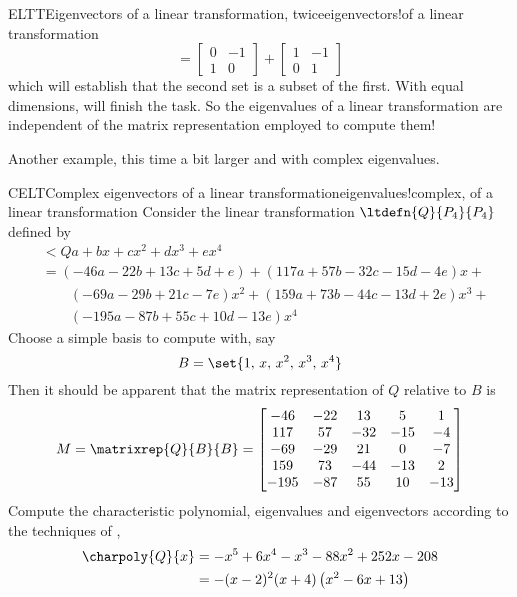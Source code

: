 \begin{example}{ELTT}{Eigenvectors of a linear transformation, twice}{eigenvectors!of a linear transformation}
\begin{equation*}
=
\begin{bmatrix}0 & -1\\1 & 0\end{bmatrix}+\begin{bmatrix}1 & -1\\0 & 1\end{bmatrix}
\end{equation*}
%
which will establish that the second set is a subset of the first.  With equal dimensions,  will finish the task.
%
So the eigenvalues of a linear transformation are independent of the matrix representation employed to compute them!
%
\end{example}
%
Another example, this time a bit larger and with complex eigenvalues.
%
\begin{example}{CELT}{Complex eigenvectors of a linear transformation}{eigenvalues!complex, of a linear transformation}
Consider the linear transformation $\ltdefn{Q}{P_4}{P_4}$ defined by
%
\begin{align*}
&\lt{Q}{a+bx+cx^2+dx^3+ex^4}\\
&=(-46a-22b+13c+5d+e)+(117a+57b-32c-15d-4e) x+\\
&\quad\quad (-69a-29b+21c-7e)x^2+(159a+73b-44c-13d+2e)x^3+\\
&\quad\quad (-195a-87b+55c+10d-13e)x^4
\end{align*}
%
Choose a simple basis to compute with, say
%
\begin{equation*}
B=\set{1,\,x,\,x^2,\,x^3,\,x^4}
\end{equation*}
%
Then it should be apparent that the matrix representation of $Q$ relative to $B$ is
%
\begin{equation*}
M=\matrixrep{Q}{B}{B}=
\begin{bmatrix}
 -46 & -22 & 13 & 5 & 1 \\
 117 & 57 & -32 & -15 & -4 \\
 -69 & -29 & 21 & 0 & -7 \\
 159 & 73 & -44 & -13 & 2 \\
 -195 & -87 & 55 & 10 & -13
\end{bmatrix}
\end{equation*}
%
Compute the characteristic polynomial, eigenvalues and eigenvectors according to the techniques of ,
%
\begin{align*}
\charpoly{Q}{x}
&=-x^5+6 x^4-x^3-88 x^2+252 x-208\\
&=-(x-2)^2 (x+4) \left(x^2-6x+13\right)\\

\end{align*}
\end{example}
